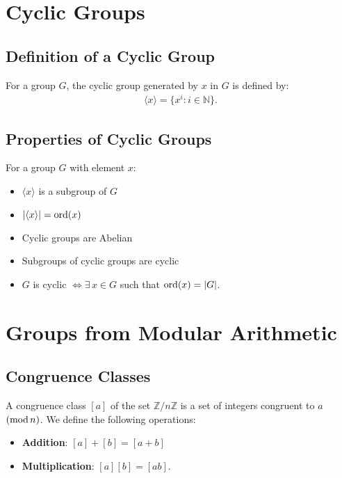 \documentclass[a4paper, 12pt, twoside]{article}
\begin{document}
\newpage

\section{Cyclic Groups}

\subsection{Definition of a Cyclic Group}

For a group $G$, the cyclic group generated by $x$ in $G$ is defined by:
\begin{align*}
      \langle x \rangle = \{x^i : i \in \mathbb{N}\}.
\end{align*}

\subsection{Properties of Cyclic Groups}

For a group $G$ with element $x$:

\begin{itemize}
      \item $\langle x \rangle$ is a subgroup of $G$
      \item $|\langle x \rangle| = \operatorname{ord}(x)$
      \item Cyclic groups are Abelian
      \item Subgroups of cyclic groups are cyclic
      \item $G$ is cyclic $\Leftrightarrow \exists \, x \in G$ such
            that $\operatorname{ord}(x) = |G|$.
\end{itemize}

\section{Groups from Modular Arithmetic}

\subsection{Congruence Classes}

A congruence class $[a]$ of the set $\mathbb{Z}/n\mathbb{Z}$ is a set
of integers congruent to $a$ $(\operatorname{mod} n)$. We define the following
operations:

\begin{itemize}
      \item \textbf{Addition}: $[a] + [b] = [a + b]$
      \item \textbf{Multiplication}: $[a][b] = [ab]$.
\end{itemize}
\end{document}
